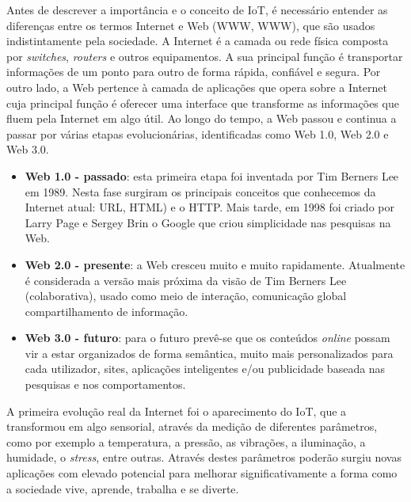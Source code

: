 Antes de descrever a importância e o conceito de \ac{IoT}, é necessário entender as diferenças entre os termos Internet e Web (\acl{WWW}, \acs{WWW}), que são usados indistintamente pela sociedade. A Internet é a camada ou rede física composta por \textit{switches}, \textit{routers} e outros equipamentos\cite{Evans2011a}. A sua principal função é transportar informações de um ponto para outro de forma rápida, confiável e segura. Por outro lado, a Web pertence à camada de aplicações que opera sobre a Internet cuja principal função é oferecer uma interface que transforme as informações que fluem pela Internet em algo útil. Ao longo do tempo, a Web passou e continua a passar por várias etapas evolucionárias, identificadas como Web 1.0, Web 2.0 e Web 3.0. 

\begin{itemize}
	\item \textbf{Web 1.0 - passado}: esta primeira etapa foi inventada por Tim Berners Lee em 1989\cite{Getting}. Nesta fase surgiram os principais conceitos que conhecemos da Internet atual: \ac{URL}, \ac{HTML}) e o \ac{HTTP}. Mais tarde, em 1998 foi criado por Larry Page e Sergey Brin o Google que criou simplicidade nas pesquisas na Web\cite{Lovato2014}. 
	
	\item \textbf{Web 2.0 - presente}: a Web cresceu muito e muito rapidamente. Atualmente é considerada a versão mais próxima da visão de Tim Berners Lee (colaborativa), usado como meio de interação, comunicação global compartilhamento de informação. 
	
	\item \textbf{Web 3.0 - futuro}: para o futuro prevê-se que os conteúdos \textit{online} possam vir a estar organizados de forma semântica, muito mais personalizados para cada utilizador, sites, aplicações inteligentes e/ou publicidade baseada nas pesquisas e nos comportamentos.
\end{itemize}

A  primeira evolução real da Internet foi o aparecimento do \ac{IoT}, que a transformou em algo sensorial, através da medição de diferentes parâmetros, como por exemplo a temperatura, a pressão, as vibrações, a iluminação, a humidade, o \textit{stress}, entre outras. Através destes parâmetros poderão surgiu novas aplicações com elevado potencial para melhorar significativamente a forma como a sociedade vive, aprende, trabalha e se diverte. 

